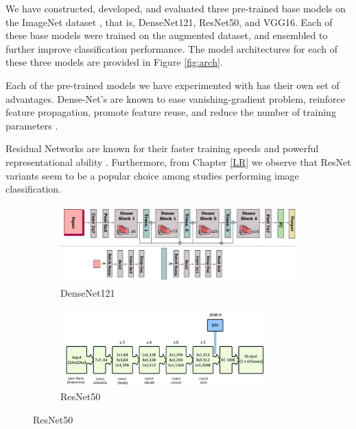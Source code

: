 We have constructed, developed, and evaluated three pre-trained base models on the ImageNet dataset \cite{IMG}, that is, DenseNet121, ResNet50, and VGG16. Each of these base models were trained on the augmented dataset, and ensembled to further improve classification performance. The model architectures for each of these three models are provided in Figure \ref{fig:arch}.

Each of the pre-trained models we have experimented with has their own set of advantages. Dense-Net's are known to ease vanishing-gradient problem, reinforce feature propagation, promote feature reuse, and reduce the number of training parameters \cite{HLW+2016}.

Residual Networks are known for their faster training speeds and powerful representational ability \cite{BAK2016, FEN2017}. Furthermore, from Chapter \ref{LR} we observe that ResNet variants seem to be a popular choice among studies performing image classification.
\vspace{0.5em}
\begin{figure}[H]
        \begin{subfigure}[]{0.49\linewidth}
                \includegraphics[height=3cm]{Images/DenseNet121.png}
                \caption{DenseNet121 \cite{DEN}}
                \label{fig:DenseNet}
        \end{subfigure}%
        \begin{subfigure}[]{0.49\linewidth}
                \includegraphics[height=3cm]{Images/ResNet.png}
                \caption{ResNet50 \cite{MOB+2020}}
                \label{fig:ResNet}
        \end{subfigure}%

\end{figure}

